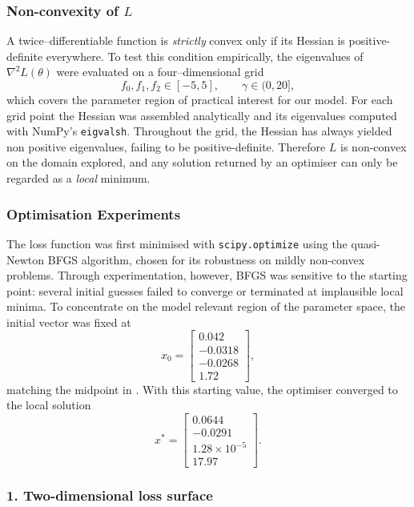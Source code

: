 \documentclass[12pt]{article}
\begin{document}
\subsubsection{Non-convexity of \(L\)}
A twice–differentiable function is \emph{strictly} convex only if its Hessian is positive-definite everywhere.  
To test this condition empirically, the eigenvalues of \(\nabla^{2}L(\theta)\) were evaluated on a four–dimensional grid  
\[
f_0,f_1,f_2\in[-5,5],\qquad
\gamma\in(0,20],
\]
which covers the parameter region of practical interest for our model.
For each grid point the Hessian was assembled analytically and its eigenvalues computed with NumPy’s \texttt{eigvalsh}.  
Throughout the grid, the Hessian has always yielded non positive eigenvalues, failing to be positive-definite.  
Therefore \(L\) is non-convex on the domain explored, and any solution returned by an optimiser can only be regarded as a \emph{local} minimum. 

\subsubsection{Optimisation Experiments}
The loss function was first minimised with \verb|scipy.optimize| using the quasi-Newton BFGS algorithm, chosen for its robustness on mildly non-convex problems. Through experimentation, however, BFGS was sensitive to the starting point: several initial guesses failed to converge or terminated at implausible local minima. To concentrate on the model relevant region of the parameter space, the initial vector was fixed at
\[
x_{0}
=\begin{bmatrix}
   0.042 \\[2pt] -0.0318 \\[2pt] -0.0268 \\[2pt] 1.72
 \end{bmatrix},
\]
matching the midpoint in \citet{DieboldLi2006}.  With this starting value, the optimiser converged to the local solution
\[
x^{*}
=\begin{bmatrix}
   0.0644 \\[2pt] -0.0291 \\[2pt] 1.28\times10^{-5} \\[2pt] 17.97
 \end{bmatrix}.
\]

\subsubsection*{1. Two-dimensional loss surface}
\end{document}

